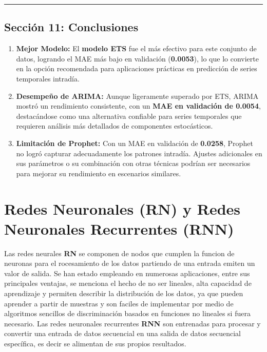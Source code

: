 \documentclass[
]{book}
\begin{document}
\begin{center}\rule{0.5\linewidth}{0.5pt}\end{center}

\section{\texorpdfstring{\textbf{Sección 11: Conclusiones}}{Sección 11: Conclusiones}}\label{secciuxf3n-11-conclusiones}

\begin{enumerate}
\def\labelenumi{\arabic{enumi}.}
\item
  \textbf{Mejor Modelo:} El \textbf{modelo ETS} fue el más efectivo para este conjunto de datos, logrando el MAE más bajo en validación (\textbf{0.0053}), lo que lo convierte en la opción recomendada para aplicaciones prácticas en predicción de series temporales intradía.
\item
  \textbf{Desempeño de ARIMA:} Aunque ligeramente superado por ETS, ARIMA mostró un rendimiento consistente, con un \textbf{MAE en validación de 0.0054}, destacándose como una alternativa confiable para series temporales que requieren análisis más detallados de componentes estocásticos.
\item
  \textbf{Limitación de Prophet:} Con un MAE en validación de \textbf{0.0258}, Prophet no logró capturar adecuadamente los patrones intradía. Ajustes adicionales en sus parámetros o su combinación con otras técnicas podrían ser necesarios para mejorar su rendimiento en escenarios similares.
\end{enumerate}

\chapter{Redes Neuronales (RN) y Redes Neuronales Recurrentes (RNN)}\label{redes-neuronales-rn-y-redes-neuronales-recurrentes-rnn}

Las redes neurales \textbf{RN} se componen de nodos que cumplen la funcion de neuronas para el rocesamiento de los datos partiendo de una entrada emiten un valor de salida. Se han estado empleando en numerosas aplicaciones, entre sus principales ventajas, se menciona el hecho de no ser lineales, alta capacidad de aprendizaje y permiten describir la distribución de los datos, ya que pueden aprender a partir de muestras y son faciles de implementar por medio de algoritmos sencillos de discriminación basados en funciones no lineales si fuera necesario. Las redes neuronales recurrentes \textbf{RNN} son entrenadas para procesar y convertir una entrada de datos secuencial en una salida de datos secuencial específica, es decir se alimentan de sus propios resultados.
\end{document}
